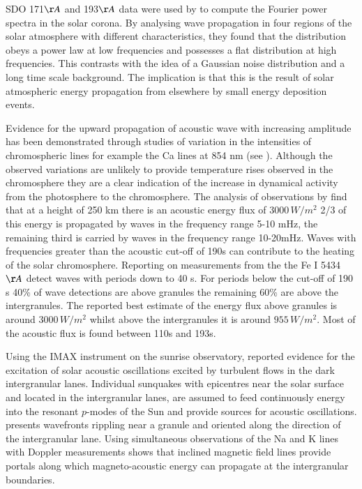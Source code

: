 \documentclass[preprint,authoryear,12pt]{elsarticle}
\begin{document}
SDO 171$\AA$ and 193$\AA$ data were used by \citet{Ireland2015} to compute the Fourier power spectra in the solar corona. By analysing wave propagation in four regions of the solar atmosphere with different characteristics, they found that the distribution obeys a power law at low frequencies and possesses a flat distribution at high frequencies. This contrasts with the idea of a Gaussian noise distribution and a long time scale background. The implication is that this is the result of solar atmospheric energy propagation from elsewhere by small energy deposition events.

Evidence for the upward propagation of acoustic wave with increasing amplitude has been demonstrated through studies of 
variation in the intensities of chromospheric lines for example the Ca lines at 854 nm (see  \citet{Beck2012}). Although the 
observed variations are unlikely to provide temperature rises observed in the chromosphere they are a clear indication of the increase in dynamical activity from the photosphere to the chromosphere. The analysis of observations by  \citet{Bello2009} find that at a height of 250 km there is an acoustic energy flux of $3000 \,W/m^2$  2/3 of this energy is propagated by waves in the frequency range 5-10 mHz, the remaining third is carried by waves in the frequency range 10-20mHz. Waves with frequencies greater than the acoustic cut-off of 190s can contribute to the heating of the solar chromosphere. Reporting on measurements from the the Fe I 5434 ${\AA}$ \citet{Bello2010A} detect waves with periods down to 40 s. For periods below the cut-off of 190 s 40\% of wave detections are above granules the remaining 60\% are above the intergranules. The reported best estimate of the energy flux above granules is around $3000 \, W/m^2$ whilst above the intergranules it is around $955 \, W/m^2$. Most of the acoustic flux is found between 110s and 193s.

Using the IMAX instrument on the sunrise observatory, \citet{Roth2010}  reported evidence for the excitation of solar acoustic oscillations excited by turbulent flows  in the dark intergranular lanes.  Individual sunquakes with epicentres near the solar surface and located in the intergranular lanes, are assumed to feed continuously energy into the resonant $p$-modes of the Sun and provide sources for acoustic oscillations. \citet{Roth2010} presents wavefronts rippling near a granule and oriented along the direction of the intergranular lane. Using simultaneous observations of the Na and K lines with Doppler measurements  \citet{Jefferies2006} shows that inclined magnetic field lines provide portals along which magneto-acoustic energy can propagate at the intergranular boundaries.
\end{document}
